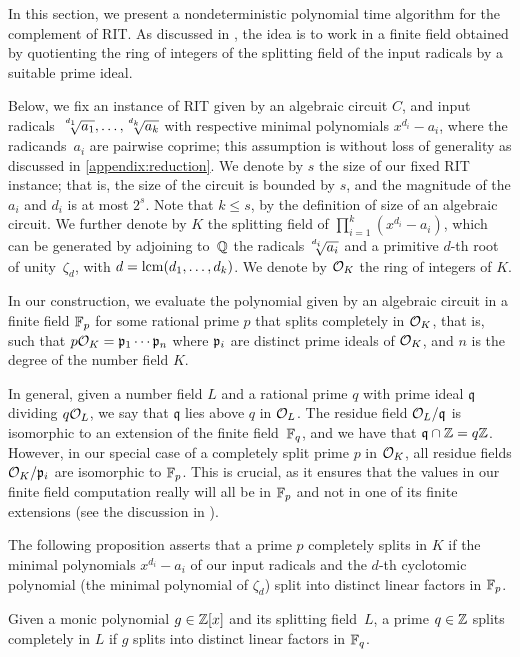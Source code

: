 
In this section, we present a nondeterministic polynomial time algorithm for the complement of RIT. As discussed in , the idea is to work in a finite field obtained by quotienting the ring of integers of the splitting field of the input radicals by a suitable prime ideal.

Below, we fix an instance of  RIT  given by an algebraic circuit $C$, and input radicals~$\mysqrt{d_1}{a_1},\ldots,\mysqrt{d_k}{a_k}$ with respective minimal polynomials $x^{d_i}-a_i$, where the radicands~$a_i$ are pairwise coprime;
this assumption is without loss of generality as discussed in \cref{appendix:reduction}.
We denote by $s$ the size of our fixed RIT instance; that is, the size of the circuit is bounded by $s$,  and the magnitude of the $a_i$ and $d_i$ is at most $2^s$. Note that  $k\leq s$, by the definition of size of an algebraic circuit. 
 We further  denote by $K$ the splitting field  of $\prod_{i=1}^k (x^{d_i}-a_i)$, which can be generated by adjoining to~$\mathbb{Q}$ the radicals $\mysqrt{d_i}{a_i}$ and a primitive $d$-th root of unity~$\zeta_d$, with $d = \operatorname{lcm}(d_1,\ldots,d_k)$. We denote by $\mathcal{O}_K$ the ring of integers of $K$.


In our construction, we evaluate the polynomial given by an algebraic circuit in a finite field $\mathbb{F}_p$ for some rational prime $p$ that splits completely in $\mathcal{O}_K$, that is, such that $p\mathcal{O}_K = \mathfrak{p}_1\cdots \mathfrak{p}_n$ where $\mathfrak{p}_i$ are distinct prime ideals of $\mathcal{O}_K$, and $n$ is the degree of the number field $K$.

In general, given a number field $L$ and a rational prime $q$ with prime ideal $\mathfrak{q}$ dividing $q\mathcal{O}_L$, we say that $\mathfrak{q}$ lies above $q$ in $\mathcal{O}_L$. The residue field $\mathcal{O}_L/\mathfrak{q}$ is isomorphic to an extension of the finite field~$\mathbb{F}_q$, 
and we have that $\mathfrak{q} \cap \mathbb{Z}=q\mathbb{Z}$.
 However, in our special case of a completely split prime $p$ in $\mathcal{O}_K$, all residue fields $\mathcal{O}_K/\mathfrak{p}_i$ are isomorphic to $\mathbb{F}_p$. This is crucial, as it ensures that the values in our finite field computation really will all be in $\mathbb{F}_p$ and not in one of its finite extensions (see the discussion in ).

The following proposition asserts that a prime $p$ completely splits in $K$ if the minimal polynomials $x^{d_i}-a_i$ of our input radicals and the $d$-th cyclotomic polynomial (the minimal polynomial of $\zeta_d$) split into distinct linear factors in $\mathbb{F}_p$.

\begin{proposition}
	\label{prop:split_primes_qp}
	Given a monic polynomial $g \in\mathbb{Z}[x]$ and its splitting field~$L$, 
	a prime $q\in\mathbb{Z}$ splits completely in $L$ if $g$ splits into distinct linear factors in $\mathbb{F}_q$. 
\end{proposition}

